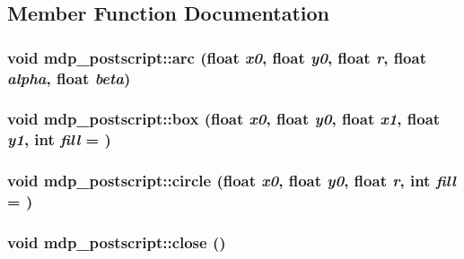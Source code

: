 \subsection{Member Function Documentation}
\hypertarget{classmdp__postscript_a56092f2141d3d1b0cc4afd333bed5e1e}{
\subsubsection[{arc}]{\setlength{\rightskip}{0pt plus 5cm}void mdp\_\-postscript::arc (float {\em x0}, \/  float {\em y0}, \/  float {\em r}, \/  float {\em alpha}, \/  float {\em beta})}}
\label{classmdp__postscript_a56092f2141d3d1b0cc4afd333bed5e1e}
\hypertarget{classmdp__postscript_aa44192cb071b678edb48adb39053a396}{
\subsubsection[{box}]{\setlength{\rightskip}{0pt plus 5cm}void mdp\_\-postscript::box (float {\em x0}, \/  float {\em y0}, \/  float {\em x1}, \/  float {\em y1}, \/  int {\em fill} = {})}}
\label{classmdp__postscript_aa44192cb071b678edb48adb39053a396}
\hypertarget{classmdp__postscript_abfa4c3e6cfd19b2ddb190ca9a5f2df02}{
\subsubsection[{circle}]{\setlength{\rightskip}{0pt plus 5cm}void mdp\_\-postscript::circle (float {\em x0}, \/  float {\em y0}, \/  float {\em r}, \/  int {\em fill} = {})}}
\label{classmdp__postscript_abfa4c3e6cfd19b2ddb190ca9a5f2df02}
\hypertarget{classmdp__postscript_af41a3aa09549d5acb2b5e9a098f69089}{
\subsubsection[{close}]{\setlength{\rightskip}{0pt plus 5cm}void mdp\_\-postscript::close ()}}
